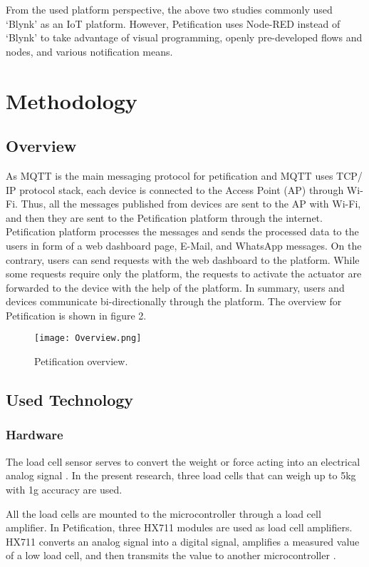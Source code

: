 \documentclass[conference]{IEEEtran}
\begin{document}
From the used platform perspective, the above two studies commonly used ‘Blynk’ as an IoT platform. However, Petification uses Node-RED instead of ‘Blynk’ to take advantage of visual programming, openly pre-developed flows and nodes, and various notification means.

\section{Methodology}
\subsection{Overview}
As MQTT is the main messaging protocol for petification and MQTT uses TCP/ IP protocol stack, each device is connected to the Access Point (AP) through Wi-Fi. Thus, all the messages published from devices are sent to the AP with Wi-Fi, and then they are sent to the Petification platform through the internet. Petification platform processes the messages and sends the processed data to the users in form of a web dashboard page, E-Mail, and WhatsApp messages. On the contrary, users can send requests with the web dashboard to the platform. While some requests require only the platform, the requests to activate the actuator are forwarded to the device with the help of the platform. In summary, users and devices communicate bi-directionally through the platform. The overview for Petification is shown in figure 2.

\begin{figure}[htbp]
\centerline{\texttt{[image: Overview.png]}}
\caption{Petification overview.}
\label{fig}
\end{figure}

\subsection{Used Technology}
\subsubsection{Hardware}
The load cell sensor serves to convert the weight or force acting into an electrical analog signal \cite{b15}. In the present research, three load cells that can weigh up to 5kg with 1g accuracy are used.

All the load cells are mounted to the microcontroller through a load cell amplifier. In Petification, three HX711 modules are used as load cell amplifiers. HX711 converts an analog signal into a digital signal, amplifies a measured value of a low load cell, and then transmits the value to another microcontroller \cite{b16}. 
\end{document}
